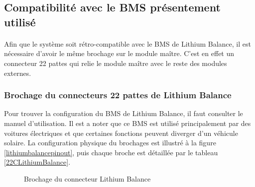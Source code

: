 \subsection{Compatibilité avec le BMS présentement utilisé}
	\paragraph*{}	
	Afin que le système soit rétro-compatible avec le BMS de Lithium Balance, il est nécessaire d'avoir le même brochage sur le module maître. C'est en effet un connecteur 22 pattes qui relie le module maître avec le reste des modules externes.

	\subsubsection{Brochage du connecteurs 22 pattes de Lithium Balance}
	
	Pour trouver la configuration du BMS de Lithium Balance, il faut consulter le manuel d'utilisation. Il est a noter que ce BMS est utilisé principalement par des voitures électriques et que certaines fonctions peuvent diverger d'un véhicule solaire. La configuration physique du brochages est illustré à la figure \ref{lithiumbalancepinout}, puis chaque broche est détaillée par le tableau \ref{22CLithiumBalance}.
	
	\begin{figure}[H]
		\centering
		\caption{Brochage du connecteur Lithium Balance}
		\label{fig:lithiumbalancepinout}
	\end{figure}
	
